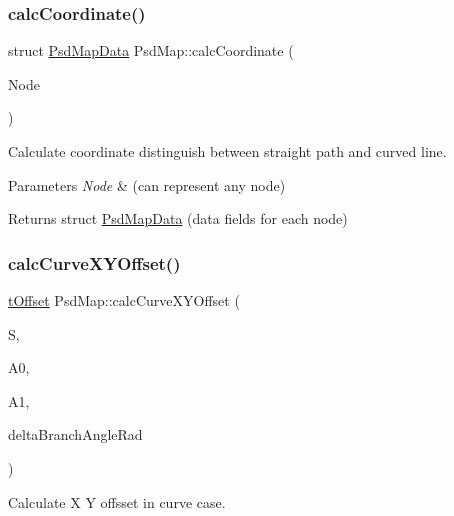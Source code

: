 \subsubsection{\texorpdfstring{calc\+Coordinate()}{calcCoordinate()}}
{\footnotesize\ttfamily struct \hyperlink{struct_psd_map_data}{Psd\+Map\+Data} Psd\+Map\+::calc\+Coordinate (\begin{DoxyParamCaption}\item[{struct \hyperlink{struct_tree_node}{Tree\+Node} $\ast$}]{Node }\end{DoxyParamCaption})}



Calculate coordinate distinguish between straight path and curved line. 


\begin{DoxyParams}{Parameters}
{\em Node} & (can represent any node) \\
\hline
\end{DoxyParams}
\begin{DoxyReturn}{Returns}
struct \hyperlink{struct_psd_map_data}{Psd\+Map\+Data} (data fields for each node) 
\end{DoxyReturn}
\mbox{\label{class_psd_map_ac7db4ce816867efd9074a54a99b7d046}} 
\subsubsection{\texorpdfstring{calc\+Curve\+X\+Y\+Offset()}{calcCurveXYOffset()}}
{\footnotesize\ttfamily \hyperlink{_psd_message_decoder_8h_a7d8466510c49a8035fcf35b2949bea5a}{t\+Offset} Psd\+Map\+::calc\+Curve\+X\+Y\+Offset (\begin{DoxyParamCaption}\item[{double}]{S,  }\item[{double}]{A0,  }\item[{double}]{A1,  }\item[{double}]{delta\+Branch\+Angle\+Rad }\end{DoxyParamCaption})}



Calculate X Y offsset in curve case. 


